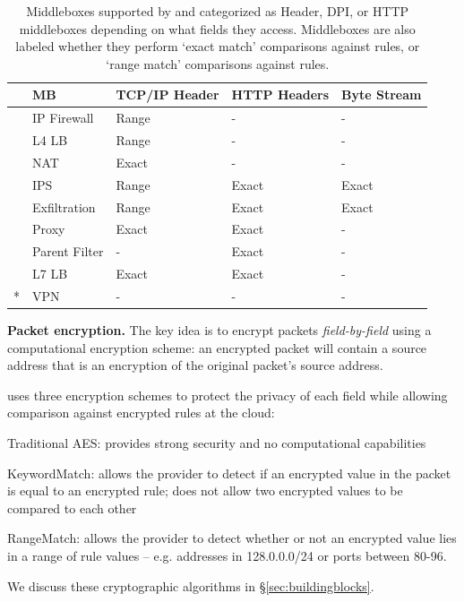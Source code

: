 \begin{table}
\centering
\small
\hspace{-2pt}
\begin{tabular}{l|l|p{.45in}|p{.45in}|p{.45in}}
&{\bf MB}&{\bf TCP/IP Header}&{\bf HTTP Headers}&{\bf Byte Stream}\\

\hline

\parbox[t]{1mm}{}
&IP Firewall&Range&-&-\\
&L4 LB&Range&-&-\\
&NAT&Exact&-&-\\
\hline


\parbox[t]{1mm}{}
&IPS&Range&Exact&Exact\\
&Exfiltration&Range&Exact&Exact\\
\hline

\parbox[t]{1mm}{}
&Proxy&Exact&Exact&-\\
&Parent Filter&-&Exact&-\\
&L7 LB&Exact&Exact&-\\
\hline
*&VPN&-&-&-\\

\end{tabular}
\caption[]{Middleboxes supported by \sys and categorized as Header, DPI, or HTTP middleboxes depending on what fields they access. Middleboxes are also labeled whether they perform `exact match' comparisons against rules, or `range match' comparisons against rules.\label{tbl:mbreqs}}

\end{table}



\noindent\textbf{Packet encryption.}
The key idea is to encrypt packets {\it field-by-field} using a computational encryption scheme: \eg{}  an encrypted packet will contain a source address that is an encryption of the original packet's source address.

\sys uses three encryption schemes to protect the privacy of each field while allowing comparison against encrypted rules at the cloud: 

\begin{myitemize}
\item Traditional AES: provides strong security and no computational capabilities
\item KeywordMatch:  allows the provider to detect if an encrypted value in the packet is equal to an encrypted rule; does not allow two encrypted values to be compared to each other
\item RangeMatch: allows the provider to detect whether or not an encrypted value lies in a range of rule values -- e.g. addresses in 128.0.0.0/24 or ports between 80-96.
\end{myitemize}
We discuss these cryptographic algorithms in \S\ref{sec:buildingblocks}.

